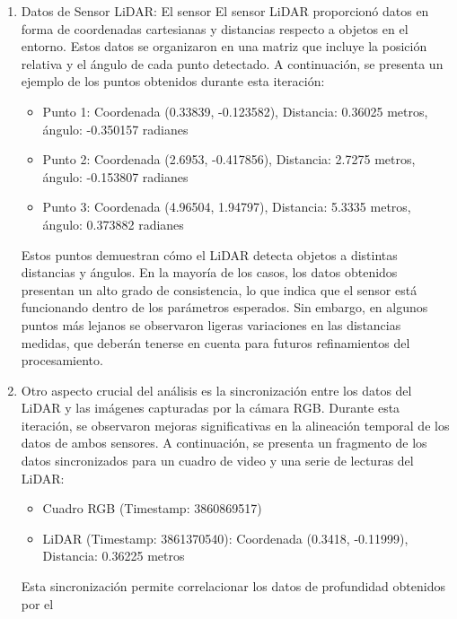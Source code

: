     \begin{enumerate}
        \item Datos de Sensor LiDAR: El sensor El sensor LiDAR proporcion\'o datos en forma de coordenadas cartesianas 
            y distancias respecto a objetos en el entorno. Estos datos se organizaron en una matriz que incluye la 
            posici\'on relativa y el \'angulo de cada punto detectado. A continuaci\'on, se presenta un ejemplo de los 
            puntos obtenidos durante esta iteraci\'on:
            \begin{itemize}
                \item Punto 1: Coordenada (0.33839, -0.123582), Distancia: 0.36025 metros, \'angulo: -0.350157 radianes
                \item Punto 2: Coordenada (2.6953, -0.417856), Distancia: 2.7275 metros, \'angulo: -0.153807 radianes
                \item Punto 3: Coordenada (4.96504, 1.94797), Distancia: 5.3335 metros, \'angulo: 0.373882 radianes
            \end{itemize}
        Estos puntos demuestran c\'omo el LiDAR detecta objetos a distintas distancias y \'angulos. 
            En la mayor\'ia de los casos, los datos obtenidos presentan un alto grado de consistencia, 
            lo que indica que el sensor est\'a funcionando dentro de los par\'ametros esperados. Sin embargo, 
            en algunos puntos m\'as lejanos se observaron ligeras variaciones en las distancias medidas, que 
            deber\'an tenerse en cuenta para futuros refinamientos del procesamiento.
        \item Otro aspecto crucial del an\'alisis es la sincronizaci\'on entre los datos del LiDAR y 
            las im\'agenes capturadas por la c\'amara RGB. Durante esta iteraci\'on, se 
            observaron mejoras significativas en la alineaci\'on temporal de los datos de ambos sensores. 
            A continuaci\'on, se presenta un fragmento de los datos sincronizados para un cuadro de video 
            y una serie de lecturas del LiDAR:
            \begin{itemize}
                \item Cuadro RGB (Timestamp: 3860869517)
                \item LiDAR (Timestamp: 3861370540): Coordenada (0.3418, -0.11999), Distancia: 0.36225 metros
            \end{itemize}
        Esta sincronizaci\'on permite correlacionar los datos de profundidad obtenidos por el 

\end{enumerate}
